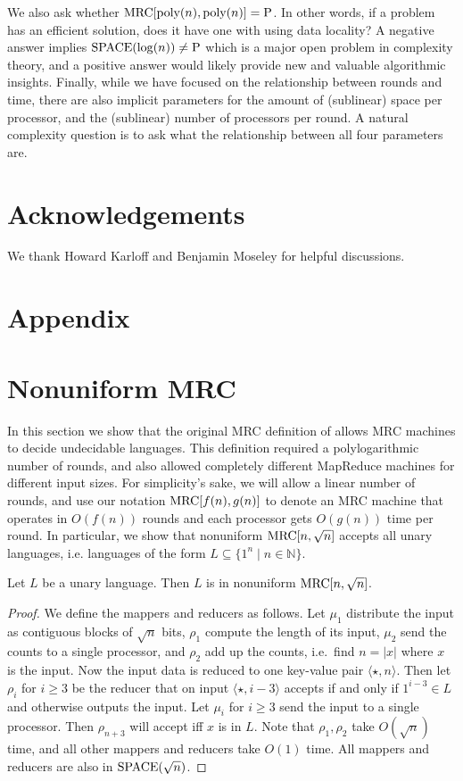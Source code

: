 \documentclass{llncs}
\newcommand{\N}{\mathbb{N}}
\newcommand{\mrc}{\textup{MRC}}
\newcommand{\SPACE}{\textup{SPACE}}
\renewcommand{\P}{\textup{P}}
\renewcommand{\L}{\textup{SPACE}(\log(n))}
\begin{document}
We also ask whether $\mrc[\text{poly}(n), \text{poly}(n)] = \P$. In other
words, if a problem has an efficient solution, does it have one with using data
locality? A negative answer implies $\L\neq\P$ which is a major open problem in
complexity theory, and a positive answer would likely provide new and valuable
algorithmic insights. Finally, while we have focused on the relationship
between rounds and time, there are also implicit parameters for the amount of
(sublinear) space per processor, and the (sublinear) number of processors per
round. A natural complexity question is to ask what the relationship
between all four parameters are.

\section*{Acknowledgements} We thank Howard Karloff and Benjamin Moseley for
helpful discussions.




\section*{Appendix}

\appendix
\section{Nonuniform MRC}
In this section we show that the original MRC definition of \cite{Karloff10}
allows MRC machines to decide undecidable languages.
This definition required a polylogarithmic number
of rounds, and also allowed completely different MapReduce machines for
different input sizes.
For simplicity's sake, we will allow a linear number of rounds,
and use our notation $\mrc[f(n), g(n)]$ to denote an MRC machine
that operates in $O(f(n))$ rounds and each processor gets $O(g(n))$ time
per round.
In particular, we show that
nonuniform $\mrc[n, \sqrt{n}]$ accepts all unary languages, i.e. languages of
the form $L \subseteq \{1^n \mid n \in \N\}$.

\begin{lemma}\label{lemma:unary}
Let $L$ be a unary language. Then $L$ is in nonuniform $\mrc[n, \sqrt{n}]$.
\end{lemma}

\begin{proof}
We define the mappers and reducers as follows. Let $\mu_1$ distribute the input
as contiguous blocks of $\sqrt{n}$ bits, $\rho_1$ compute the length of its
input, $\mu_2$ send the counts to a single processor, and $\rho_2$ add up the
counts, i.e.\ find $n=|x|$ where $x$ is the input. Now the input data is
reduced to one key-value pair $\langle \star, n \rangle$. Then let $\rho_i$ for
$i \ge 3$ be the reducer that on input $\langle \star, i-3 \rangle$ accepts if
and only if $1^{i-3} \in L$ and otherwise outputs the input. Let $\mu_i$ for $i
\ge 3$ send the input to a single processor. Then $\rho_{n+3}$ will accept iff
$x$ is in $L$. Note that $\rho_1, \rho_2$ take $O(\sqrt{n})$ time, and all
other mappers and reducers take $O(1)$ time. All mappers and reducers are also
in $\SPACE(\sqrt{n})$. \end{proof}
\end{document}
